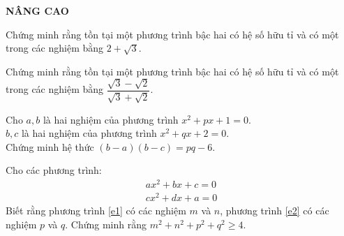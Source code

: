 \begin{center}
	\textbf{NÂNG CAO}
\end{center}
\begin{ex}%
	Chứng minh rằng tồn tại một phương trình bậc hai có hệ số hữu tỉ và có một trong các nghiệm bằng $2+\sqrt{3}$.
\end{ex}
\begin{ex}%
	Chứng minh rằng tồn tại một phương trình bậc hai có hệ số hữu tỉ và có một trong các nghiệm bằng $\dfrac{\sqrt{3}-\sqrt{2}}{\sqrt{3}+\sqrt{2}}$.
\end{ex}
\begin{ex}%
	Cho $a,b$ là hai nghiệm của phương trình $x^2+px+1=0$.\\
	$b,c$ là hai nghiệm của phương trình $x^2+qx+2=0$.\\
	Chứng minh hệ thức $(b-a)(b-c)=pq-6$.
\end{ex}
\begin{ex}%
	Cho các phương trình:
	\begin{align}
	ax^2+bx+c=0 \label{e1} \\
	cx^2+dx+a=0 \label{e2}
	\end{align}
	Biết rằng phương trình \eqref{e1} có các nghiệm $m$ và $n$, phương trình \eqref{e2} có các nghiệm $p$ và $q$. Chứng minh rằng $m^2+n^2+p^2+q^2 \geq 4$.
\end{ex}
